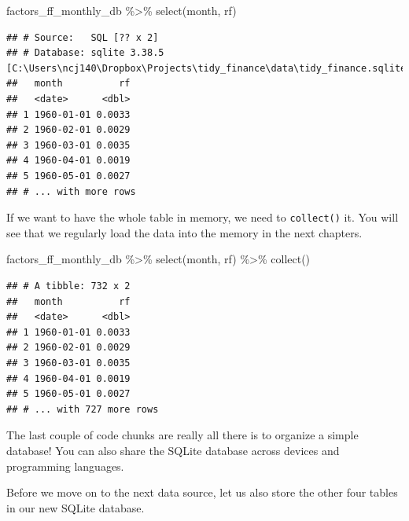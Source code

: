 \documentclass[
]{krantz}
\newenvironment{Shaded}{\begin{snugshade}}{\end{snugshade}}
\newcommand{\FunctionTok}[1]{\textcolor[rgb]{0,0,0}{#1}}
\newcommand{\NormalTok}[1]{#1}
\newcommand{\SpecialCharTok}[1]{\textcolor[rgb]{0,0,0}{#1}}
\begin{document}
\begin{Shaded}
\begin{Highlighting}[]
\NormalTok{factors\_ff\_monthly\_db }\SpecialCharTok{\%\textgreater{}\%}
  \FunctionTok{select}\NormalTok{(month, rf)}
\end{Highlighting}
\end{Shaded}

\begin{verbatim}
## # Source:   SQL [?? x 2]
## # Database: sqlite 3.38.5 [C:\Users\ncj140\Dropbox\Projects\tidy_finance\data\tidy_finance.sqlite]
##   month          rf
##   <date>      <dbl>
## 1 1960-01-01 0.0033
## 2 1960-02-01 0.0029
## 3 1960-03-01 0.0035
## 4 1960-04-01 0.0019
## 5 1960-05-01 0.0027
## # ... with more rows
\end{verbatim}

If we want to have the whole table in memory, we need to \texttt{collect()} it. You will see that we regularly load the data into the memory in the next chapters.

\begin{Shaded}
\begin{Highlighting}[]
\NormalTok{factors\_ff\_monthly\_db }\SpecialCharTok{\%\textgreater{}\%}
  \FunctionTok{select}\NormalTok{(month, rf) }\SpecialCharTok{\%\textgreater{}\%}
  \FunctionTok{collect}\NormalTok{()}
\end{Highlighting}
\end{Shaded}

\begin{verbatim}
## # A tibble: 732 x 2
##   month          rf
##   <date>      <dbl>
## 1 1960-01-01 0.0033
## 2 1960-02-01 0.0029
## 3 1960-03-01 0.0035
## 4 1960-04-01 0.0019
## 5 1960-05-01 0.0027
## # ... with 727 more rows
\end{verbatim}

The last couple of code chunks are really all there is to organize a simple database! You can also share the SQLite database across devices and programming languages.

Before we move on to the next data source, let us also store the other four tables in our new SQLite database.
\end{document}
